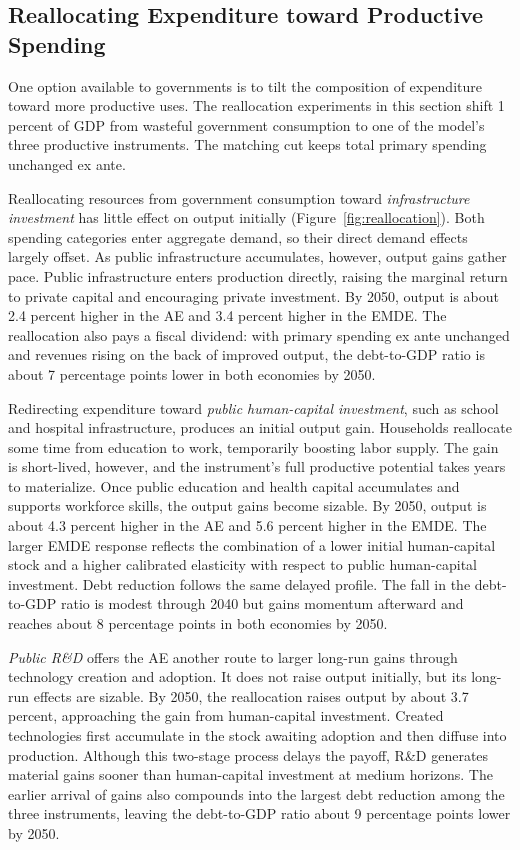 \documentclass[a4paper,11pt]{article}
\begin{document}
\subsection{Reallocating Expenditure toward Productive Spending}

One option available to governments is to tilt the composition of expenditure toward more productive uses.
The reallocation experiments in this section shift 1 percent of GDP from wasteful government consumption to one of the model's three productive instruments.
The matching cut keeps total primary spending unchanged ex ante.

Reallocating resources from government consumption toward \emph{infrastructure investment} has little effect on output initially (Figure~\ref{fig:reallocation}).
Both spending categories enter aggregate demand, so their direct demand effects largely offset.
As public infrastructure accumulates, however, output gains gather pace.
Public infrastructure enters production directly, raising the marginal return to private capital and encouraging private investment.
By 2050, output is about 2.4 percent higher in the AE and 3.4 percent higher in the EMDE.
The reallocation also pays a fiscal dividend: with primary spending ex ante unchanged and revenues rising on the back of improved output, the debt-to-GDP ratio is about 7 percentage points lower in both economies by 2050.

Redirecting expenditure toward \emph{public human-capital investment}, such as school and hospital infrastructure, produces an initial output gain.
Households reallocate some time from education to work, temporarily boosting labor supply.
The gain is short-lived, however, and the instrument's full productive potential takes years to materialize.
Once public education and health capital accumulates and supports workforce skills, the output gains become sizable.
By 2050, output is about 4.3 percent higher in the AE and 5.6 percent higher in the EMDE.
The larger EMDE response reflects the combination of a lower initial human-capital stock and a higher calibrated elasticity with respect to public human-capital investment.
Debt reduction follows the same delayed profile.
The fall in the debt-to-GDP ratio is modest through 2040 but gains momentum afterward and reaches about 8 percentage points in both economies by 2050.

\emph{Public R\&D} offers the AE another route to larger long-run gains through technology creation and adoption.
It does not raise output initially, but its long-run effects are sizable.
By 2050, the reallocation raises output by about 3.7 percent, approaching the gain from human-capital investment.
Created technologies first accumulate in the stock awaiting adoption and then diffuse into production.
Although this two-stage process delays the payoff, R\&D generates material gains sooner than human-capital investment at medium horizons.
The earlier arrival of gains also compounds into the largest debt reduction among the three instruments, leaving the debt-to-GDP ratio about 9 percentage points lower by 2050.
\end{document}
